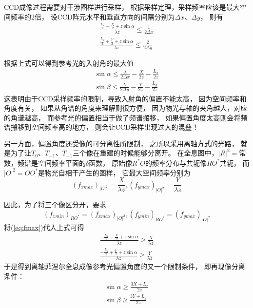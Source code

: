 \documentclass[11pt,a4paper]{article}
\begin{document}
CCD成像过程需要对干涉图样进行采样，
根据采样定理，采样频率应该是最大空间频率的2倍，
设CCD阵元水平和垂直方向的间隔分别为$\Delta x、\Delta y$，
则有
\begin{equation}
\begin{split}
\frac{\frac{L_x}{2}+\frac{X}{2}+z\sin\alpha}{\lambda z} \le \frac{1}{2\Delta x} \\
\frac{\frac{L_y}{2}+\frac{Y}{2}+z\sin\alpha}{\lambda z} \le \frac{2}{2\Delta y}
\end{split}
\end{equation}

根据上式可以得到参考光的入射角的最大值
\begin{equation}
\begin{split}
\sin\alpha\le\frac{\lambda}{2\Delta x}-\frac{X}{2z}-\frac{L_x}{2z} \\
\sin\beta\le\frac{\lambda}{2\Delta y}-\frac{Y}{2z}-\frac{L_y}{2z}
\end{split}
\label{eq:max_angle}
\end{equation}
这表明由于CCD采样频率的限制，导致入射角的偏置不能太高，
因为空间频率和角度有关，
如果从角谱的角度来理解则很方便，
因为物光与轴的夹角越大，对应的角谱越高，
而参考光的偏置相当于做了频谱搬移，
如果偏置角度太高则会将频谱搬移到空间频率高的地方，
则会让CCD采样出现过大的混叠！

另一方面，偏置角度还受像的可分离性所限制，
之所以采用离轴方式的光路，
就是为了让$T_0、T_{-1}、T_{+1}$三个像在重建的时候能够分离开。
在全息图中，$|R|^2=$常数，频谱是空间频率平面的$\delta$函数，
原始像$R^*O$的频率分布与共轭像$RO^*$共轭，
而$|O|^2=OO^*$是物光自相干产生的图样，
它最大空间频率分别为\cite{goodman2006傅里叶光学导论}
\begin{equation}
(f_{xmax})_{|O|^2} =\frac{X}{\lambda z}, 
(f_{ymax})_{|O|^2} =\frac{Y}{\lambda z}
\end{equation}

因此，为了将三个像区分开，要求
\begin{equation}
(f_{xmin})_{RO^*}= (f_{xmax})_{|O|^2},
(f_{ymin})_{RO^*}= (f_{ymax})_{|O|^2}
\end{equation}
将(\ref{eq:fmax})代入上式可得
\begin{equation}
\begin{split}
\frac{-\frac{L_x}{2}-\frac{X}{2}+z\sin\alpha}{\lambda z} \ge \frac{X}{\lambda z}\\
\frac{-\frac{L_y}{2}+\frac{Y}{2}+z\sin\alpha}{\lambda z} \ge \frac{Y}{\lambda z}
\end{split}
\end{equation}
于是得到离轴菲涅尔全息成像参考光偏置角度的又一个限制条件，
即再现像分离条件：
\begin{equation}
\begin{split}
\sin \alpha \ge \frac{3X+L_x}{2z} \\
\sin \beta \ge \frac{3Y+L_y}{2z}
\end{split}
\label{eq:min_angle}
\end{equation}
\end{document}
